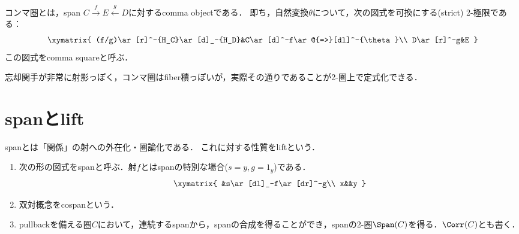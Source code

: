 \documentclass[uplatex,dvipdfmx]{jsreport}
\begin{document}
\begin{definition}
    コンマ圏とは，span $C\xrightarrow{f}E\xleftarrow{g}D$に対するcomma objectである．
    即ち，自然変換$\theta$について，次の図式を可換にする(strict) 2-極限である：
    \[\xymatrix{
        (f/g)\ar[r]^-{H_C}\ar[d]_-{H_D}&C\ar[d]^-f\ar@{=>}[dl]^-{\theta}\\
        D\ar[r]^-g&E
    }\]
    この図式をcomma squareと呼ぶ．
\end{definition}
\begin{remarks}
    忘却関手が非常に射影っぽく，コンマ圏はfiber積っぽいが，実際その通りであることが2-圏上で定式化できる．
\end{remarks}

\section{spanとlift}

\begin{tcolorbox}[colframe=ForestGreen, colback=ForestGreen!10!white, breakable ,colbacktitle=ForestGreen!40!white, coltitle=black,fonttitle=\bfseries\sffamily,
    title=]
    spanとは「関係」の射への外在化・圏論化である．
    これに対する性質をliftという．
\end{tcolorbox}

\begin{definition}\mbox{}
    \begin{enumerate}
        \item 次の形の図式をspanと呼ぶ．射$f$とはspanの特別な場合($s=y,g=1_y$)である．
        \[\xymatrix{
            &s\ar[dl]_-f\ar[dr]^-g\\
            x&&y
        }\]
        \item 双対概念をcospanという．
        \item pullbackを備える圏$C$において，連続するspanから，spanの合成を得ることができ，spanの2-圏$\Span(C)$を得る．$\Corr(C)$とも書く．
    \end{enumerate}
\end{definition}
\end{document}
